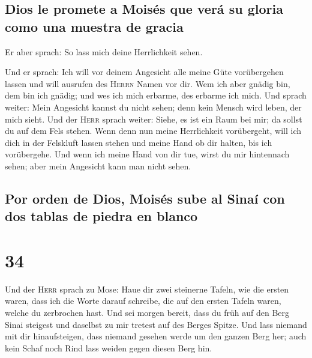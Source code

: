 \hypertarget{dios-le-promete-a-moisuxe9s-que-veruxe1-su-gloria-como-una-muestra-de-gracia}{%
\subsection{Dios le promete a Moisés que verá su gloria como una muestra
de
gracia}\label{dios-le-promete-a-moisuxe9s-que-veruxe1-su-gloria-como-una-muestra-de-gracia}}

 Er aber sprach: So lass mich deine Herrlichkeit sehen.

 Und er sprach: Ich will vor deinem Angesicht alle meine
Güte vorübergehen lassen und will ausrufen des \textsc{Herrn} Namen vor
dir. Wem ich aber gnädig bin, dem bin ich gnädig; und wes ich mich
erbarme, des erbarme ich mich.  Und sprach weiter: Mein
Angesicht kannst du nicht sehen; denn kein Mensch wird leben, der mich
sieht.  Und der \textsc{Herr} sprach weiter: Siehe, es
ist ein Raum bei mir; da sollst du auf dem Fels stehen. 
Wenn denn nun meine Herrlichkeit vorübergeht, will ich dich in der
Felskluft lassen stehen und meine Hand ob dir halten, bis ich
vorübergehe.  Und wenn ich meine Hand von dir tue, wirst
du mir hintennach sehen; aber mein Angesicht kann man nicht sehen.

\hypertarget{por-orden-de-dios-moisuxe9s-sube-al-sinauxed-con-dos-tablas-de-piedra-en-blanco}{%
\subsection{Por orden de Dios, Moisés sube al Sinaí con dos tablas de
piedra en
blanco}\label{por-orden-de-dios-moisuxe9s-sube-al-sinauxed-con-dos-tablas-de-piedra-en-blanco}}

\hypertarget{section-33}{%
\section{34}\label{section-33}}

 Und der \textsc{Herr} sprach zu Mose: Haue dir zwei
steinerne Tafeln, wie die ersten waren, dass ich die Worte darauf
schreibe, die auf den ersten Tafeln waren, welche du zerbrochen hast.
 Und sei morgen bereit, dass du früh auf den Berg Sinai
steigest und daselbst zu mir tretest auf des Berges Spitze.
 Und lass niemand mit dir hinaufsteigen, dass niemand
gesehen werde um den ganzen Berg her; auch kein Schaf noch Rind lass
weiden gegen diesen Berg hin.

